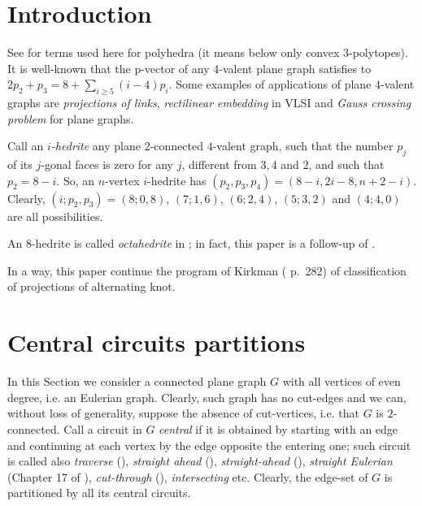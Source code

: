 \documentclass[12pt]{article}
\begin{document}
\section{Introduction}

See \cite{Gr} for terms used here for polyhedra (it means below only convex
$3$-polytopes).
It is well-known that the p-vector of any $4$-valent plane graph satisfies to
$2p_2+p_3=8+ \sum_{i\geq 5} (i-4)p_i$.
Some examples of applications of plane $4$-valent graphs are {\em projections
of links}, {\em rectilinear embedding} in VLSI and {\em Gauss crossing 
problem} for plane graphs.

\vspace{2mm}





Call an {\em $i$-hedrite} any plane $2$-connected
$4$-valent graph, such that the number
$p_j$ of its $j$-gonal faces is zero for any $j$, different from 
$3,4$ and $2$, and such that $p_2=8-i$. So, 
an $n$-vertex $i$-hedrite has $(p_2, p_3, p_4)=(8-i, 2i-8, n+2-i)$.
Clearly, $(i;p_2,p_3)=(8;0,8)$, $(7;1,6)$, $(6;2,4)$,
$(5;3,2)$ and $(4;4,0)$ are all possibilities. 

An $8$-hedrite is called {\em octahedrite} in \cite{DSt}; in fact, this paper is a follow-up of \cite{DSt}.

In a way, this paper continue the program of Kirkman (\cite{Kirk} p.~282) of classification of projections of alternating knot.


















\section{Central circuits partitions}

In this Section we consider a connected plane graph $G$ with all vertices of 
even degree, i.e. an Eulerian graph. Clearly, such graph has no cut-edges and
we can, without loss of generality, suppose the absence of 
cut-vertices, i.e. that $G$ is $2$-connected.
Call a circuit in $G$ {\it central} if it is obtained by starting with an
edge and continuing at each vertex by the edge opposite the entering one; such 
circuit is called also {\em traverse} 
(\cite{GK}), {\em straight ahead} (\cite{Ha}),  
{\em straight-ahead} (\cite{PTZ}), {\em straight Eulerian}
(Chapter 17 of \cite{God}), {\em cut-through}
(\cite{Je}),
{\em intersecting} etc. Clearly, the edge-set of 
$G$ is partitioned by all its central circuits.
\end{document}
